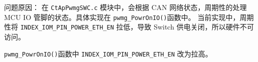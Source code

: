 问题原因：
在 \lstinline{CtApPwmgSWC.c} 模块中，会根据 CAN 网络状态，周期性的处理 MCU IO 管脚的状态。具体实现在 \lstinline{pwmg_PowrOnIO()}函数中。
当前实现中，周期性将 \lstinline{INDEX_IOM_PIN_POWER_ETH_EN} 拉低，导致 Switch 供电关闭，所以硬件不可访问。

\begin{definition}[解决方案]
    \lstinline{pwmg_PowrOnIO()}函数中 \lstinline{INDEX_IOM_PIN_POWER_ETH_EN} 改为拉高。
\end{definition}